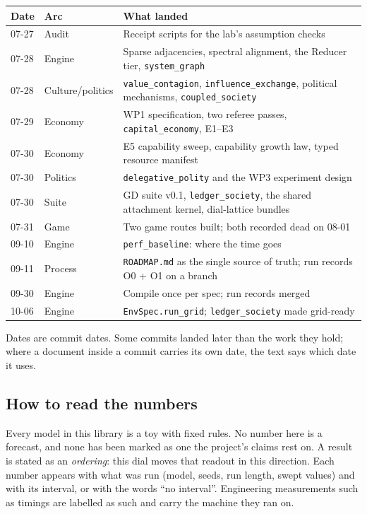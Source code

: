\documentclass[11pt]{article}
\newcommand{\code}[1]{\texttt{#1}}
\begin{document}
\begin{center}
\begin{tabular}{@{}llp{8.2cm}@{}}
\toprule
\textbf{Date} & \textbf{Arc} & \textbf{What landed} \\
\midrule
07-27 & Audit & Receipt scripts for the lab's assumption checks \\
07-28 & Engine & Sparse adjacencies, spectral alignment, the Reducer tier, \code{system\_graph} \\
07-28 & Culture/politics & \code{value\_contagion}, \code{influence\_exchange}, political mechanisms, \code{coupled\_society} \\
07-29 & Economy & WP1 specification, two referee passes, \code{capital\_economy}, E1--E3 \\
07-30 & Economy & E5 capability sweep, capability growth law, typed resource manifest \\
07-30 & Politics & \code{delegative\_polity} and the WP3 experiment design \\
07-30 & Suite & GD suite v0.1, \code{ledger\_society}, the shared attachment kernel, dial-lattice bundles \\
07-31 & Game & Two game routes built; both recorded dead on 08-01 \\
09-10 & Engine & \code{perf\_baseline}: where the time goes \\
09-11 & Process & \code{ROADMAP.md} as the single source of truth; run records O0 + O1 on a branch \\
09-30 & Engine & Compile once per spec; run records merged \\
10-06 & Engine & \code{EnvSpec.run\_grid}; \code{ledger\_society} made grid-ready \\
\bottomrule
\end{tabular}
\end{center}

\noindent Dates are commit dates. Some commits landed later than the work they hold;
where a document inside a commit carries its own date, the text says which date it
uses.

\subsection*{How to read the numbers}

Every model in this library is a toy with fixed rules. No number here is a forecast,
and none has been marked as one the project's claims rest on. A result is stated as an
\emph{ordering}: this dial moves that readout in this direction. Each number appears
with what was run (model, seeds, run length, swept values) and with its interval, or
with the words ``no interval''. Engineering measurements such as timings are labelled
as such and carry the machine they ran on.
\end{document}
